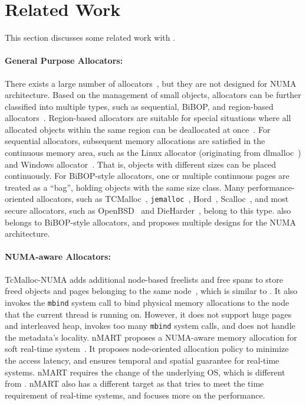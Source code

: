 \section{Related Work}

\label{sec:related}

This section discusses some related work with \NM{}. 

\paragraph{General Purpose Allocators:}
 There exists a large number of allocators~\cite{dlmalloc, Hoard, TCMalloc, jemalloc, Scalloc}, but they are not designed for NUMA architecture. Based on the management of small objects, allocators can be further classified into multiple types, such as sequential, BiBOP, and region-based allocators~\cite{DieHarder, Gay:1998:MME:277650.277748}. Region-based allocators are suitable for special situations where all allocated objects within the same region can be deallocated at once~\cite{Gay:1998:MME:277650.277748}. For sequential allocators, subsequent memory allocations are satisfied in the continuous memory area, such as the Linux allocator (originating from dlmalloc~\cite{dlmalloc}) and Windows allocator~\cite{DieHarder}. That is, objects with different sizes can be placed continuously. For BiBOP-style allocators, one or multiple continuous pages are treated as a ``bag'', holding objects with the same size class. Many performance-oriented allocators, such as TCMalloc~\cite{TCMalloc}, \texttt{jemalloc}~\cite{jemalloc}, Hord~\cite{Hoard}, Scalloc~\cite{Scalloc}, and most secure allocators, such as OpenBSD~\cite{OpenBSD} and DieHarder~\cite{DieHarder}, belong to this type.  \NM{} also belongs to BiBOP-style allocators, and proposes multiple designs for the NUMA architecture. 

\paragraph{NUMA-aware Allocators:} TcMalloc-NUMA adds additional node-based freelists and free spans to store freed objects and pages belonging to the same node~\cite{tcmallocnew}, which is similar to \NM{}. It also invokes the \texttt{mbind} system call to bind physical memory allocations to the node that the current thread is running on. However, it does not support huge pages and interleaved heap, invokes too many \texttt{mbind} system calls, and does not handle the metadata's locality. nMART proposes a NUMA-aware memory allocation for soft real-time system~\cite{kim2013node}. It proposes node-oriented allocation policy to minimize the access latency, and ensures temporal and spatial guarantee for real-time systems. nMART requires the change of the underlying OS, which is different from \NM{}. nMART also has a different target as \NM{} that tries to meet the time requirement of real-time systems, and \NM{} focuses more on the performance.

